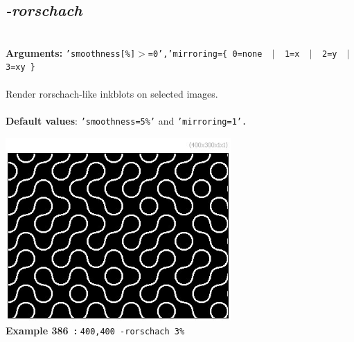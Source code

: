 \documentclass[a4paper,11pt,twoside]{book}
\begin{document}
\subsection{\emph{-rorschach} }\vspace*{-0.5em}
~\\\textbf{Arguments: } 
{\small \texttt{'smoothness[\%]$>$=0','mirroring=\{ 0=none ~$|$~ 1=x ~$|$~ 2=y ~$|$~ 3=xy \}}}\\~\\
Render rorschach-like inkblots on selected images.
~\\~\\\textbf{Default values}: {\small \texttt{'smoothness=5\%'} and \texttt{'mirroring=1'.}}
\begin{center}\includegraphics[keepaspectratio=true,height=7cm,width=\textwidth]{img/gmic_def386.jpg}\\
{\footnotesize \textbf{Example 386~:} \texttt{400,400 -rorschach 3\%}}
\end{center}
\end{document}
